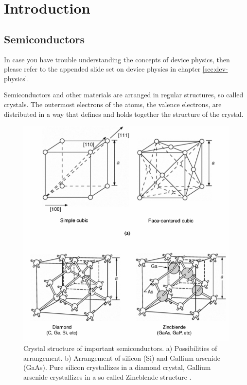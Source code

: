 \documentclass[main]{subfiles}
\begin{document}
\section{Introduction}

\subsection{Semiconductors}
In case you have trouble understanding the concepts of device physics, then please refer to the appended slide set on device physics in chapter \ref{sec:dev-physics}.

Semiconductors and other materials are arranged in regular structures, so called crystals. The outermost electrons of the atoms, the valence electrons, are distributed in a way that defines and holds together the structure of the crystal.

\begin{figure}[H]
\centering
\includegraphics[scale=0.3]{pics/crystal_structure.png}
\caption{Crystal structure of important semiconductors. a) Possibilities of arrangement. b) Arrangement of silicon (Si) and Gallium arsenide (GaAs). Pure silicon crystallizes in a diamond crystal, Gallium arsenide crystallizes in a so called Zincblende structure \cite{book:VLSI}.}
\end{figure}
\end{document}

